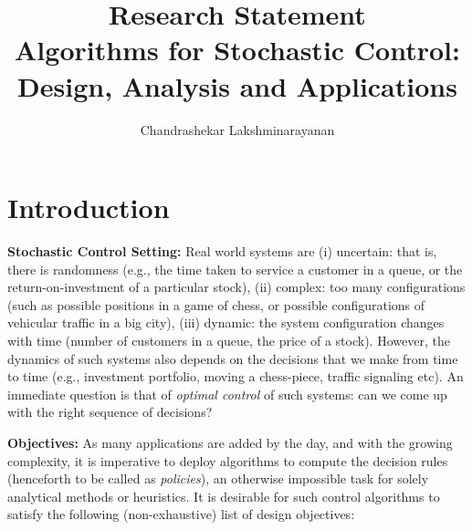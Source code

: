 \documentclass[onecolumn,12pt]{IEEEtran}
\title{\large Research Statement\\Algorithms for Stochastic Control: Design, Analysis and Applications}
\author{Chandrashekar Lakshminarayanan}
\begin{document}
\maketitle
%


\section{Introduction}\label{intro}
\textbf{ Stochastic Control Setting:} Real world systems are (i) uncertain: that is, there is randomness (e.g., the time taken to service a customer in a queue, or the return-on-investment of a particular stock), (ii) complex: too many configurations (such as possible positions in a game of chess, or possible configurations of vehicular traffic in a big city), (iii) dynamic: the system configuration changes with time (number of customers in a queue, the price of a stock). However, the dynamics of such systems also depends on the decisions that we make from time to time (e.g., investment portfolio, moving a chess-piece, traffic signaling etc). 
An immediate question is that of \emph{optimal control} of such systems: can we come up with the right sequence of decisions?

\textbf{Objectives:}  As many applications are added by the day, and with the growing complexity, it is imperative to deploy algorithms to compute the decision rules (henceforth to be called as \emph{policies}), an otherwise impossible task for solely analytical methods or heuristics.  It is desirable for such control algorithms to satisfy the following (non-exhaustive) list of design objectives:
\end{document}

